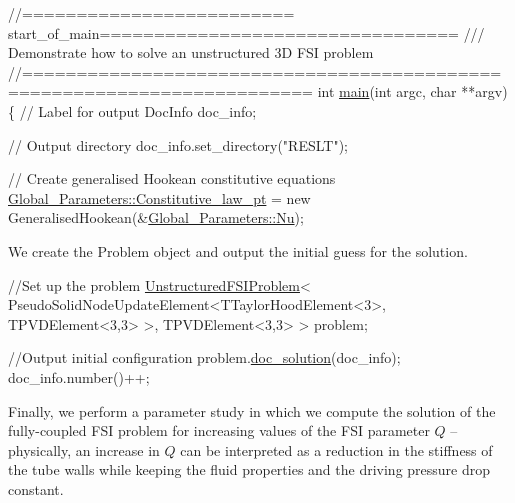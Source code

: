 
\begin{DoxyCodeInclude}
\textcolor{comment}{//========================= start\_of\_main=================================}
\textcolor{comment}{/// Demonstrate how to solve an unstructured 3D FSI problem}
\textcolor{comment}{}\textcolor{comment}{//========================================================================}
\textcolor{keywordtype}{int} \hyperlink{unstructured__three__d__fsi_8cc_a3c04138a5bfe5d72780bb7e82a18e627}{main}(\textcolor{keywordtype}{int} argc, \textcolor{keywordtype}{char} **argv)
\{
 \textcolor{comment}{// Label for output}
 DocInfo doc\_info;
 
 \textcolor{comment}{// Output directory}
 doc\_info.set\_directory(\textcolor{stringliteral}{"RESLT"});
 
 \textcolor{comment}{// Create generalised Hookean constitutive equations}
 \hyperlink{namespaceGlobal__Parameters_adbd1f040f375c96fe56b3f475f7dbec2}{Global\_Parameters::Constitutive\_law\_pt} = 
  \textcolor{keyword}{new} GeneralisedHookean(&\hyperlink{namespaceGlobal__Parameters_a20fccdcfa2c15ad8b951b9ada3bb1661}{Global\_Parameters::Nu});

\end{DoxyCodeInclude}


We create the {\ttfamily Problem} object and output the initial guess for the solution.


\begin{DoxyCodeInclude}
 
 \textcolor{comment}{//Set up the problem}
 \hyperlink{classUnstructuredFSIProblem}{UnstructuredFSIProblem}<
 PseudoSolidNodeUpdateElement<TTaylorHoodElement<3>, TPVDElement<3,3> >,
  TPVDElement<3,3> > problem;

 \textcolor{comment}{//Output initial configuration}
 problem.\hyperlink{classUnstructuredFSIProblem_a15f581318b505de07f50bd570da8c8d0}{doc\_solution}(doc\_info);
 doc\_info.number()++;   

\end{DoxyCodeInclude}


Finally, we perform a parameter study in which we compute the solution of the fully-\/coupled F\+SI problem for increasing values of the F\+SI parameter $ Q $ -- physically, an increase in $ Q $ can be interpreted as a reduction in the stiffness of the tube walls while keeping the fluid properties and the driving pressure drop constant.


